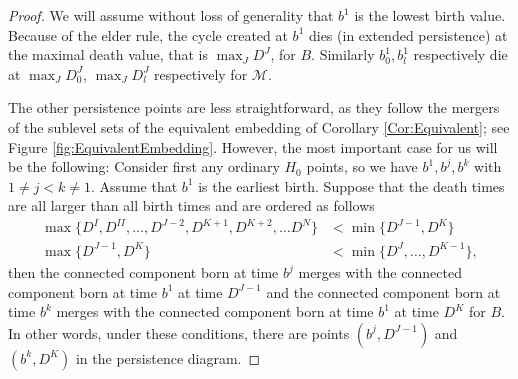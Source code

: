\documentclass[twoside,leqno]{article}
\newcommand{\M}{\mathcal{M}}
\begin{document}
\begin{proof}
We will assume without loss of generality that $b^1$ is the lowest birth value. Because of the elder rule, the cycle created at $b^1$ dies (in extended persistence) at the maximal death value, that is $\max_J D^J$, for $B$. Similarly $b^1_{0}, b^1_{l}$ respectively die at $\max_J D^J_0$,  $\max_J D^J_l$ respectively for $\M$. 

The other persistence points are less straightforward, as they  follow the mergers of the sublevel sets of the equivalent embedding of Corollary \ref{Cor:Equivalent}; see Figure \ref{fig:EquivalentEmbedding}. However, the most important case for us will be the following: 
%
Consider first any ordinary $H_0$ points, so we have $b^1, b^j,b^k$ with $1 \neq j < k \neq 1$. Assume that $b^1$ is the earliest birth. Suppose that the death times are all larger than all birth times 
and are ordered as follows
\begin{align} 
\max \{D^{I}, D^{II}, \dots, D^{J-2}, D^{K+1}, D^{K+2} , \dots D^N\}  &< \min \{ D^{J-1},  D^{K}\} 
\nonumber
\\ 
 \max \{ D^{J-1} ,D^{K}\} &< \min\{ D^{J}, \dots  , D^{K-1}\} ,
\label{eq:DeathConditions}
\end{align} 
then the connected component born at time $b^j$ merges with the connected component born at time $b^1$ at time $D^{J-1}$ and the connected component born at time $b^k$ merges with the connected component born at time $b^1$ at time $D^{K}$ for $B$. 
In other words, under these conditions, there are points $(b^j,D^{J-1})$ and $(b^k , D^K)$ in the persistence diagram. 


\end{proof}
\end{document}

